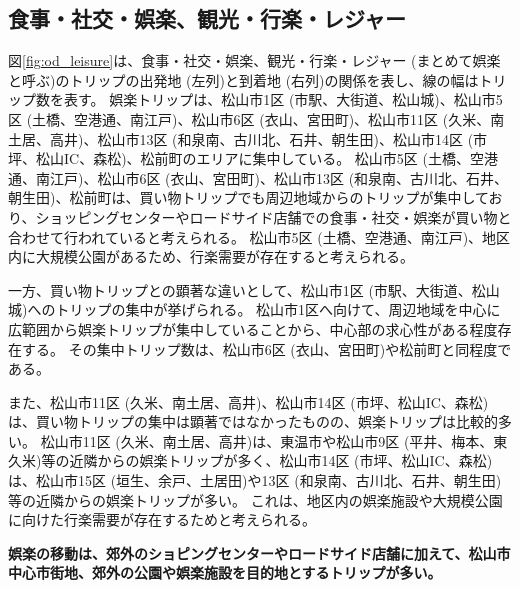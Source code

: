 \documentclass[a4paper,12pt, uplatex]{jsbook}
\begin{document}
\clearpage
\subsection{食事・社交・娯楽、観光・行楽・レジャー}
図\ref{fig:od_leisure}は、食事・社交・娯楽、観光・行楽・レジャー (まとめて娯楽と呼ぶ)のトリップの出発地 (左列)と到着地 (右列)の関係を表し、線の幅はトリップ数を表す。
娯楽トリップは、松山市1区 (市駅、大街道、松山城)、松山市5区 (土橋、空港通、南江戸)、松山市6区 (衣山、宮田町)、松山市11区 (久米、南土居、高井)、松山市13区 (和泉南、古川北、石井、朝生田)、松山市14区 (市坪、松山IC、森松)、松前町のエリアに集中している。
松山市5区 (土橋、空港通、南江戸)、松山市6区 (衣山、宮田町)、松山市13区 (和泉南、古川北、石井、朝生田)、松前町は、買い物トリップでも周辺地域からのトリップが集中しており、ショッピングセンターやロードサイド店舗での食事・社交・娯楽が買い物と合わせて行われていると考えられる。
松山市5区 (土橋、空港通、南江戸)、地区内に大規模公園があるため、行楽需要が存在すると考えられる。

一方、買い物トリップとの顕著な違いとして、松山市1区 (市駅、大街道、松山城)へのトリップの集中が挙げられる。
松山市1区へ向けて、周辺地域を中心に広範囲から娯楽トリップが集中していることから、中心部の求心性がある程度存在する。
その集中トリップ数は、松山市6区 (衣山、宮田町)や松前町と同程度である。

また、松山市11区 (久米、南土居、高井)、松山市14区 (市坪、松山IC、森松)は、買い物トリップの集中は顕著ではなかったものの、娯楽トリップは比較的多い。
松山市11区 (久米、南土居、高井)は、東温市や松山市9区 (平井、梅本、東久米)等の近隣からの娯楽トリップが多く、松山市14区 (市坪、松山IC、森松)は、松山市15区 (垣生、余戸、土居田)や13区 (和泉南、古川北、石井、朝生田)等の近隣からの娯楽トリップが多い。
これは、地区内の娯楽施設や大規模公園に向けた行楽需要が存在するためと考えられる。

\color{red}
\begin{framed}
\noindent
\textbf{\large 娯楽の移動は、郊外のショピングセンターやロードサイド店舗に加えて、松山市中心市街地、郊外の公園や娯楽施設を目的地とするトリップが多い。}
\end{framed}
\color{black}
\end{document}
